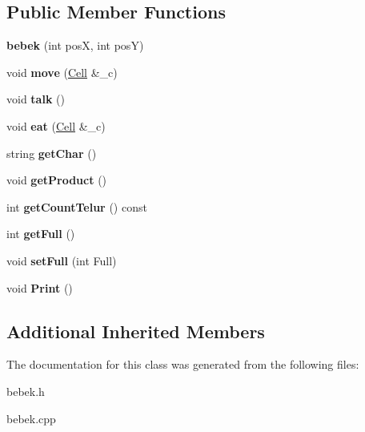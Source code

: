 \subsection*{Public Member Functions}
\begin{DoxyCompactItemize}
\item 
\mbox{\label{classbebek_a2ee5c95e76b1895eb3ebf401f25b989e}} 
{\bfseries bebek} (int posX, int posY)
\item 
\mbox{\label{classbebek_a1d2f44701e8a3bcd56e4943a3cf656f5}} 
void {\bfseries move} (\hyperlink{classCell}{Cell} \&\+\_\+c)
\item 
\mbox{\label{classbebek_a0347ebaf065829f58091d8ef0084ddf7}} 
void {\bfseries talk} ()
\item 
\mbox{\label{classbebek_a02e34a62d7d183cb4c0d07128e017d23}} 
void {\bfseries eat} (\hyperlink{classCell}{Cell} \&\+\_\+c)
\item 
\mbox{\label{classbebek_a7a2fb45437d729e5bfa8daadf4dc19cf}} 
string {\bfseries get\+Char} ()
\item 
\mbox{\label{classbebek_adb6b95132683fd5274f8e4335b0bfdbc}} 
void {\bfseries get\+Product} ()
\item 
\mbox{\label{classbebek_afd7f0c744ae592c64965965ea686ad3b}} 
int {\bfseries get\+Count\+Telur} () const
\item 
\mbox{\label{classbebek_ab4a19af30bd41e155db357d58c975bf2}} 
int {\bfseries get\+Full} ()
\item 
\mbox{\label{classbebek_aa68ecf45df676aa449d075a82b3c748c}} 
void {\bfseries set\+Full} (int Full)
\item 
\mbox{\label{classbebek_a9a63ba814dbce03026bf539120910ccc}} 
void {\bfseries Print} ()
\end{DoxyCompactItemize}
\subsection*{Additional Inherited Members}


The documentation for this class was generated from the following files\+:\begin{DoxyCompactItemize}
\item 
bebek.\+h\item 
bebek.\+cpp\end{DoxyCompactItemize}
